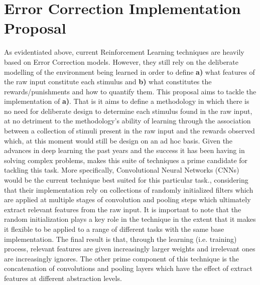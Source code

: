 \documentclass[10pt]{article}
\begin{document}
\section{Error Correction Implementation Proposal}

    As evidentiated above, current Reinforcement Learning techniques are heavily based on Error Correction models. However, they still rely on the deliberate modelling of the environment being learned in order to define \textbf{a)} what features of the raw input constitute each stimulus and \textbf{b)} what constitutes the rewards/punishments and how to quantify them. This proposal aims to tackle the implementation of \textbf{a)}. That is it aims to define a methodology in which there is no need for deliberate design to determine each stimulus found in the raw input, at no detriment to the methodology's ability of learning through the association between a collection of stimuli present in the raw input and the rewards observed which, at this moment would still be design on an ad hoc basis.
    Given the advances in deep learning the past years and the success it has been having in solving complex problems, makes this suite of techniques a prime candidate for tackling this task. More specifically, Convolutional Neural Networks (CNNs) would be the current technique best suited for this particular task., considering that their implementation rely on collections of randomly initialized filters which are applied at multiple stages of convolution and pooling steps which ultimately extract relevant features from the raw input. It is important to note that the random initialization plays a key role in the technique in the extent that it makes it flexible to be applied to a range of different tasks with the same base implementation. The final result is that, through the learning (i.e. training) process, relevant features are given increasingly larger weights and irrelevant ones are increasingly ignores. The other prime component of this technique is the concatenation of convolutions and pooling layers which have the effect of extract features at different abstraction levels.
\end{document}
